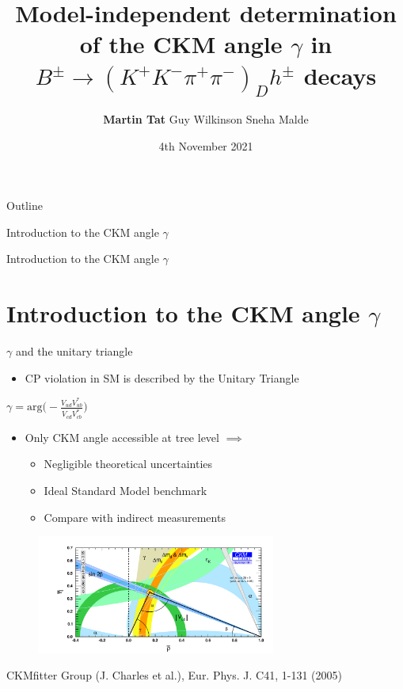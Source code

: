 \documentclass{beamer}
\title[$B^\pm\to(K^+K^-\pi^+\pi^-)_Dh^\pm$]{Model-independent determination of the CKM angle \texorpdfstring{$\gamma$}{gamma} in \texorpdfstring{$B^\pm\to(K^+K^-\pi^+\pi^-)_Dh^\pm$}{B to K+K-pi+pi-} decays}
\author{\textbf{Martin Tat} \hspace{0.54em} Guy Wilkinson \hspace{0.54em} Sneha Malde}
\institute{\normalsize University of Oxford \\ \vspace{0.3cm} \normalsize B2OC Meeting \vspace{-0.2cm}}
\date{4th November 2021}
\begin{document}
\begin{frame}
  \titlepage
\end{frame}

\begin{frame}{Outline}
  \tableofcontents
\end{frame}

\begin{frame}{Introduction to the CKM angle $\gamma$}
  \begin{center}
    {\huge Introduction to the CKM angle $\gamma$}
  \end{center}
\end{frame}

\section{Introduction to the CKM angle \texorpdfstring{$\gamma$}{gamma}}
\begin{frame}{$\gamma$ and the unitary triangle}
  \begin{itemize}
    \item{CP violation in SM is described by the Unitary Triangle}
  \end{itemize}
    \begin{center}
    $\gamma = \text{arg}\Big(-\frac{V_{ud}V^*_{ub}}{V_{cd}V^*_{cb}}\Big)$
  \end{center}
  \begin{itemize}
    \item{Only CKM angle accessible at tree level $\implies$}
    \begin{itemize}
      \item{Negligible theoretical uncertainties}
      \item{Ideal Standard Model benchmark}
      \item{Compare with indirect measurements}
    \end{itemize}
  \end{itemize}
  \vspace{-0.2cm}
  \begin{figure}
    \includegraphics[width = 0.70\textwidth]{Plots/ckmfitter2.pdf}
  \end{figure}
  \vspace{-0.5cm}
  \begin{center}
    \tiny{CKMfitter Group (J. Charles et al.), Eur. Phys. J. C41, 1-131 (2005)}
  \end{center}
\end{frame}
\end{document}
